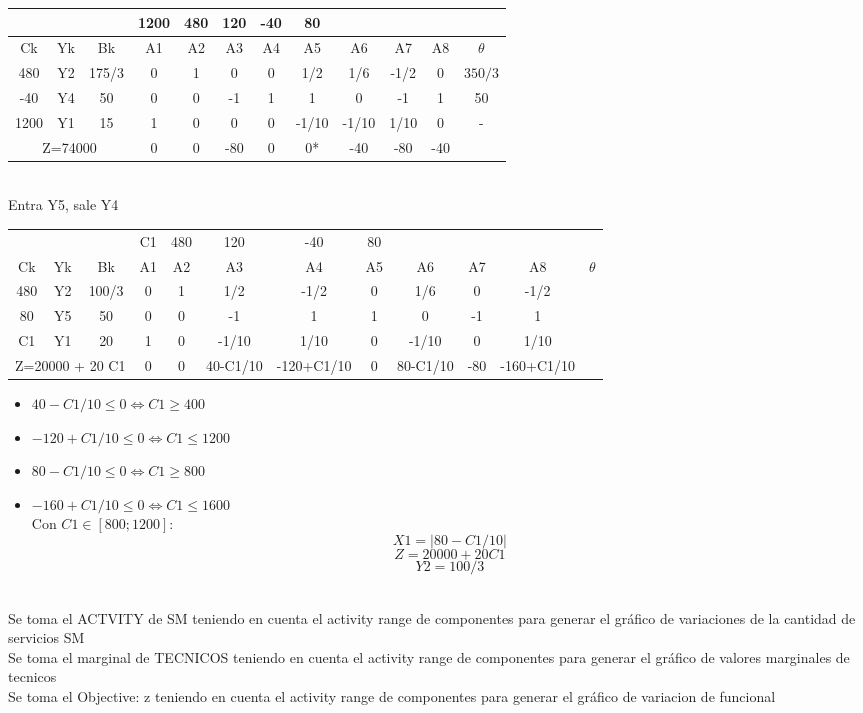 \documentclass{article}
\begin{document}
\begin{enumerate}
\begin{tabular}{|c  c  c | c  c  c  c  c  c  c  c | c |}
			\hline
			 \multicolumn{3}{|c|}{} & 1200 & 480 & 120 & -40 & 80 & & & &\\ \hline
			 Ck & Yk & Bk & A1 & A2 & A3 & A4 & A5 & A6 & A7 & A8 & $\theta$\\ \hline 
			 480 & Y2 & 175/3 & 0 & 1 & 0 & 0 & 1/2 & 1/6 & -1/2 & 0 & $350/3$\\
			 -40 & Y4 & 50 & 0 & 0 & -1 & 1 & 1 & 0 & -1 & 1 & 50\\
			 1200 & Y1 & 15 & 1 & 0 & 0 & 0 & -1/10 & -1/10 & 1/10 & 0 & -\\ \hline
			 \multicolumn{3}{|c|}{Z=74000} & 0 & 0 & -80 & 0 & 0* & -40 & -80 & -40 &\\ \hline
		\end{tabular}
		\medskip\\
		Entra Y5, sale Y4\\
		\begin{tabular}{|c  c  c | c  c  c  c  c  c  c  c | c |}
			\hline
			 \multicolumn{3}{|c|}{} & C1 & 480 & 120 & -40 & 80 & & & &\\ 
			 Ck & Yk & Bk & A1 & A2 & A3 & A4 & A5 & A6 & A7 & A8 & $\theta$\\ \hline 
			 480 & Y2 & 100/3 & 0 & 1 & 1/2 & -1/2 & 0 & 1/6 & 0 & -1/2 & \\
			 80 & Y5 & 50 & 0 & 0 & -1 & 1 & 1 & 0 & -1 & 1 & \\
			 C1 & Y1 & 20 & 1 & 0 & -1/10 & 1/10 & 0 & -1/10 & 0 & 1/10 & \\ \hline
			 \multicolumn{3}{|c|}{Z=20000 + 20 C1} & 0 & 0 & 40-C1/10 & -120+C1/10 & 0 & 80-C1/10 & -80 & -160+C1/10 &\\ \hline
		\end{tabular}
		\begin{itemize}
				\item $40 - C1/10 \leq 0 \iff C1 \geq 400$
				\item $-120 + C1/10 \leq 0 \iff C1 \leq 1200$
				\item $80 - C1/10 \leq 0 \iff C1 \geq 800$
				\item $-160 + C1/10 \leq 0 \iff C1 \leq 1600$
					\smallskip\\
					Con $C1 \in [800; 1200]$:\\
					$$X1 = |80 - C1/10|$$
					$$Z = 20000 + 20 C1$$
					$$Y2 = 100/3$$
		\end{itemize}
		
     	\smallskip\\
		Se toma el ACTVITY de SM teniendo en cuenta el activity range de componentes para generar el gr\'afico de variaciones de la cantidad de servicios SM
     	\smallskip\\
		Se toma el marginal de TECNICOS teniendo en cuenta el activity range de componentes para generar el gr\'afico de valores marginales de tecnicos  
     	\smallskip\\
		Se toma el Objective:  z teniendo en cuenta el activity range de componentes para generar el gr\'afico de variacion de funcional
     	\smallskip\\


\end{enumerate}
\end{document}
